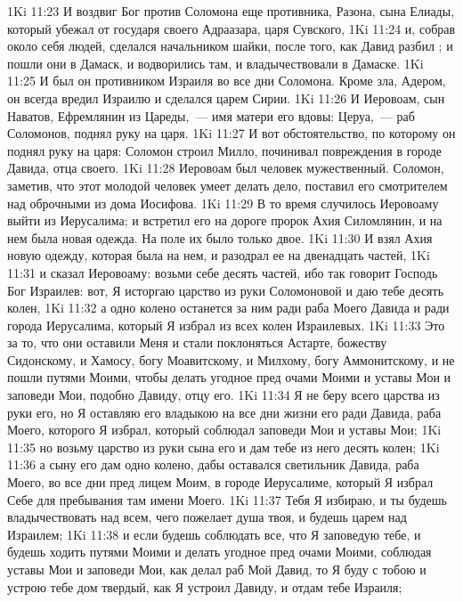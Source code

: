 \vs 1Ki 11:23 И воздвиг Бог против Соломона еще противника, Разона, сына Елиады, который убежал от государя своего Адраазара, царя Сувского,
\vs 1Ki 11:24 и, собрав около себя людей, сделался начальником шайки, после того, как Давид разбил ; и пошли они в Дамаск, и водворились там, и владычествовали в Дамаске.
\vs 1Ki 11:25 И был он противником Израиля во все дни Соломона. Кроме зла,  Адером, он всегда вредил Израилю и сделался царем Сирии.
\vs 1Ki 11:26 И Иеровоам, сын Наватов, Ефремлянин из Цареды,~--- имя матери его вдовы: Церуа,~--- раб Соломонов, поднял руку на царя.
\vs 1Ki 11:27 И вот обстоятельство, по которому он поднял руку на царя: Соломон строил Милло, починивал повреждения в городе Давида, отца своего.
\vs 1Ki 11:28 Иеровоам был человек мужественный. Соломон, заметив, что этот молодой человек умеет делать дело, поставил его смотрителем над оброчными из дома Иосифова.
\vs 1Ki 11:29 В то время случилось Иеровоаму выйти из Иерусалима; и встретил его на дороге пророк Ахия Силомлянин, и на нем была новая одежда. На поле их было только двое.
\vs 1Ki 11:30 И взял Ахия новую одежду, которая была на нем, и разодрал ее на двенадцать частей,
\vs 1Ki 11:31 и сказал Иеровоаму: возьми себе десять частей, ибо так говорит Господь Бог Израилев: вот, Я исторгаю царство из руки Соломоновой и даю тебе десять колен,
\vs 1Ki 11:32 а одно колено останется за ним ради раба Моего Давида и ради города Иерусалима, который Я избрал из всех колен Израилевых.
\vs 1Ki 11:33 Это за то, что они оставили Меня и стали поклоняться Астарте, божеству Сидонскому, и Хамосу, богу Моавитскому, и Милхому, богу Аммонитскому, и не пошли путями Моими, чтобы делать угодное пред очами Моими и  уставы Мои и заповеди Мои, подобно Давиду, отцу его.
\vs 1Ki 11:34 Я не беру всего царства из руки его, но Я оставляю его владыкою на все дни жизни его ради Давида, раба Моего, которого Я избрал, который соблюдал заповеди Мои и уставы Мои;
\vs 1Ki 11:35 но возьму царство из руки сына его и дам тебе из него десять колен;
\vs 1Ki 11:36 а сыну его дам одно колено, дабы оставался светильник Давида, раба Моего, во все дни пред лицем Моим, в городе Иерусалиме, который Я избрал Себе для пребывания там имени Моего.
\vs 1Ki 11:37 Тебя Я избираю, и ты будешь владычествовать над всем, чего пожелает душа твоя, и будешь царем над Израилем;
\vs 1Ki 11:38 и если будешь соблюдать все, что Я заповедую тебе, и будешь ходить путями Моими и делать угодное пред очами Моими, соблюдая уставы Мои и заповеди Мои, как делал раб Мой Давид, то Я буду с тобою и устрою тебе дом твердый, как Я устроил Давиду, и отдам тебе Израиля;
